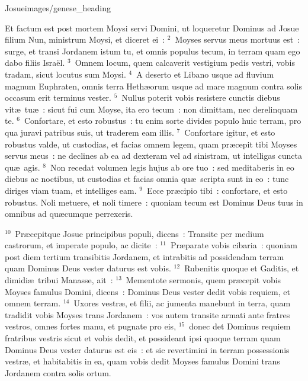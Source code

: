 {Josue}{images/genese_heading}


\lettrine[lines=10,image=true,loversize=0.05,lraise=-0.03]{E}{}t factum est post mortem Moysi servi Domini, ut loqueretur Dominus ad Josue filium Nun, ministrum Moysi, et diceret ei~:
${}^{2}$~Moyses servus meus mortuus est~: surge, et transi Jordanem istum tu, et omnis populus tecum, in terram quam ego dabo filiis Isra\"el.
${}^{3}$~Omnem locum, quem calcaverit vestigium pedis vestri, vobis tradam, sicut locutus sum Moysi.
${}^{4}$~A deserto et Libano usque ad fluvium magnum Euphraten, omnis terra Heth\ae orum usque ad mare magnum contra solis occasum erit terminus vester.
${}^{5}$~Nullus poterit vobis resistere cunctis diebus vit\ae\ tu\ae~: sicut fui cum Moyse, ita ero tecum~: non dimittam, nec derelinquam te.
${}^{6}$~Confortare, et esto robustus~: tu enim sorte divides populo huic terram, pro qua juravi patribus suis, ut traderem eam illis.
${}^{7}$~Confortare igitur, et esto robustus valde, ut custodias, et facias omnem legem, quam pr\ae cepit tibi Moyses servus meus~: ne declines ab ea ad dexteram vel ad sinistram, ut intelligas cuncta qu\ae\ agis.
${}^{8}$~Non recedat volumen legis hujus ab ore tuo~: sed meditaberis in eo diebus ac noctibus, ut custodias et facias omnia qu\ae\ scripta sunt in eo~: tunc diriges viam tuam, et intelliges eam.
${}^{9}$~Ecce pr\ae cipio tibi~: confortare, et esto robustus. Noli metuere, et noli timere~: quoniam tecum est Dominus Deus tuus in omnibus ad qu\ae cumque perrexeris.


${}^{10}$~Pr\ae cepitque Josue principibus populi, dicens~: Transite per medium castrorum, et imperate populo, ac dicite~:
${}^{11}$~Pr\ae parate vobis cibaria~: quoniam post diem tertium transibitis Jordanem, et intrabitis ad possidendam terram quam Dominus Deus vester daturus est vobis.
${}^{12}$~Rubenitis quoque et Gaditis, et dimidi\ae\ tribui Manasse, ait~:
${}^{13}$~Mementote sermonis, quem pr\ae cepit vobis Moyses famulus Domini, dicens~: Dominus Deus vester dedit vobis requiem, et omnem terram.
${}^{14}$~Uxores vestr\ae , et filii, ac jumenta manebunt in terra, quam tradidit vobis Moyses trans Jordanem~: vos autem transite armati ante fratres vestros, omnes fortes manu, et pugnate pro eis,
${}^{15}$~donec det Dominus requiem fratribus vestris sicut et vobis dedit, et possideant ipsi quoque terram quam Dominus Deus vester daturus est eis~: et sic revertimini in terram possessionis vestr\ae , et habitabitis in ea, quam vobis dedit Moyses famulus Domini trans Jordanem contra solis ortum.


